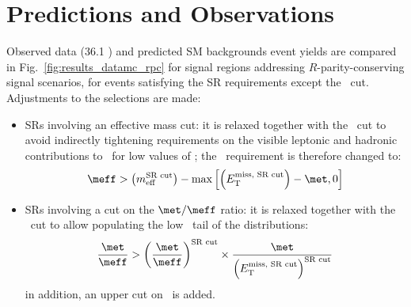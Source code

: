 \section{Predictions and Observations}

Observed data (36.1 \ifb) and predicted SM backgrounds event yields 
are compared in Fig.~\ref{fig:results_datamc_rpc} for signal regions addressing $R$-parity-conserving signal scenarios, 
for events satisfying the SR requirements except the \met\ cut. Adjustments to the selections are made: 
\begin{itemize}
\item SRs involving an effective mass cut: it is relaxed 
together with the \met\ cut to avoid indirectly tightening requirements 
on the visible leptonic and hadronic contributions to \meff\ for low values of \met; 
the \meff\ requirement is therefore changed to:
$$
\meff > \left(m_\mathrm{eff}^\text{SR cut}\right) - \operatorname{max}\left[\left(E_\mathrm{T}^\text{miss, SR cut}\right)-\met,0\right]
$$
\item SRs involving a cut on the $\met/\meff$ ratio: it is relaxed together with the \met\ cut 
to allow populating the low \met\ tail of the distributions: 
$$
\frac{\met}{\meff} > \left(\frac{\met}{\meff}\right)^\text{SR cut}\times \frac{\met}{\left(E_\mathrm{T}^\text{miss, SR cut}\right)^\text{SR cut}}
$$
in addition, an upper cut on \meff\ is added. 
\end{itemize}

